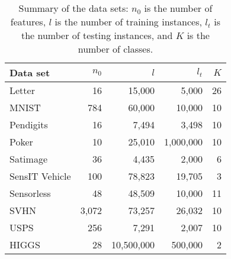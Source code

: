 \documentclass[12pt]{article}
\renewcommand{\baselinestretch}{2}
\begin{document}
\begin{table}[t]
\caption{Summary of the data sets: $n_0$ is the number of features, $l$ is the number of training instances, $l_t$ is the number of testing instances, 
and $K$ is the number of classes.}
\label{table:deep-dataset}
\begin{center}
\begin{tabular}{l r r r r}
Data set & $n_0$ & $l$ & $l_t$ & $K$ \\
\hline
{\sf Letter} & 16 & 15,000 & 5,000 & 26 \\
\hline
{\sf MNIST} & 784 & 60,000 & 10,000 & 10 \\
\hline
{\sf Pendigits} & 16 & 7,494 & 3,498 & 10 \\
\hline
{\sf Poker} & 10 & 25,010 & 1,000,000 & 10 \\
\hline
{\sf Satimage} & 36 & 4,435 & 2,000 & 6 \\
\hline
{\sf SensIT Vehicle} & 100 & 78,823 & 19,705 & 3 \\
\hline
{\sf Sensorless} & 48 & 48,509 & 10,000 & 11 \\
\hline
{\sf SVHN} & 3,072 & 73,257 & 26,032 & 10 \\
\hline
{\sf USPS} & 256 & 7,291 & 2,007 & 10 \\
\hline
{\sf HIGGS} & 28 & 10,500,000 & 500,000 & 2
\end{tabular}
\end{center}
\end{table}
\end{document}
